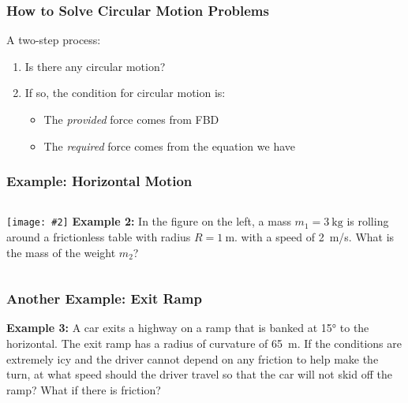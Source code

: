 \documentclass[12pt,compress,aspectratio=169]{beamer}
\newcommand{\pic}[2]{\texttt{[image: \#2]}}
\newcommand{\mb}[1]{\ensuremath\mathbf{#1}}
\begin{document}
\begin{frame}
  \frametitle{How to Solve Circular Motion Problems}

  A two-step process:
  \begin{enumerate}
  \item Is there any circular motion?
  \item If so, the condition for circular motion is:

    \vspace{-0.2in}{\Large
      \begin{displaymath}
        \mb{F}_\mathrm{provided}=\mb{F}_\mathrm{required}
      \end{displaymath}
    }
    \begin{itemize}
    \item The \emph{provided} force comes from FBD
    \item The \emph{required} force comes from the equation we have
    \end{itemize}
  \end{enumerate}
\end{frame}


\begin{frame}
  \frametitle{Example: Horizontal Motion}
  \begin{columns}
    \pic{1}{puck-on-table.jpg}
    \textbf{Example 2:} In the figure on the left, a mass $m_1=\SI{3}{\kg}$ is
    rolling around a frictionless table with radius $R=\SI{1}{\metre}$. with a
    speed of \SI{2}{\metre/s}. What is the mass of the weight $m_2$?
  \end{columns}
\end{frame}


\begin{frame}
  \frametitle{Another Example: Exit Ramp}
  \textbf{Example 3:} A car exits a highway on a ramp that is banked at
  \ang{15} to the horizontal. The exit ramp has a radius of curvature of
  \SI{65}{\metre}. If the conditions are extremely icy and the driver cannot
  depend on any friction to help make the turn, at what speed should the driver
  travel so that the car will not skid off the ramp? What if there is friction?
\end{frame}
\end{document}
